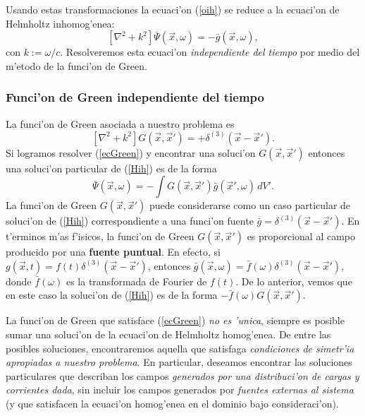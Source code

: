 Usando estas transformaciones la ecuaci'on (\ref{oih}) se reduce a la ecuaci'on de
Helmholtz inhomog'enea:
\begin{equation}
\left[ \nabla^2+k^2\right] \bar{\Psi}(\vec{x},\omega)=-\bar{g}(\vec{x},\omega),
\label{Hih}
\end{equation}
con $k:=\omega/c$. Resolveremos esta ecuaci'on \textit{independiente del tiempo} por medio del m'etodo de la funci'on de Green.

\subsubsection{Funci'on de Green independiente del tiempo}
La funci'on de Green asociada a nuestro problema es
\begin{equation}
\left[ \nabla^2+k^2\right] G(\vec{x},\vec{x}')=+\delta^{(3)}(\vec{x}-\vec{x}').
\label{ecGreen}
\end{equation}
Si logramos resolver (\ref{ecGreen}) y encontrar una soluci'on $G(\vec{x},\vec{x}')$ entonces una soluci'on particular de (\ref{Hih}) es de la forma
\begin{equation}
\bar{\Psi}(\vec{x},\omega)=-\int G(\vec{x},\vec{x}')\bar{g}(\vec{x}',\omega)\,dV'.
\end{equation}
La funci'on de Green $G(\vec{x},\vec{x}')$ puede considerarse como un caso particular de soluci'on de (\ref{Hih}) correspondiente a una funci'on fuente $\bar{g}=\delta^{(3)}(\vec{x}-\vec{x}')$. En t'erminos m'as f'isicos, la funci'on de Green $G(\vec{x},\vec{x}')$ es proporcional al campo producido por una \textbf{fuente puntual}. En efecto, si $g(\vec{x},t)=f(t)\delta^{(3)}(\vec{x}-\vec{x}')$, entonces $\bar{g}(\vec{x},\omega)=\bar{f}(\omega)\delta^{(3)}(\vec{x}-\vec{x}')$, donde $\bar{f}(\omega)$ es la transformada de Fourier de $f(t)$. De lo anterior, vemos que en este caso la soluci'on de (\ref{Hih}) es de la forma $-\bar{f}(\omega)G(\vec{x},\vec{x}')$.

La funci'on de Green que satisface (\ref{ecGreen}) \textit{no es 'unica}, siempre es posible sumar una soluci'on de la ecuaci'on de Helmholtz homog'enea. De entre las posibles soluciones, encontraremos aquella que satisfaga \textit{condiciones de simetr'ia apropiadas a nuestro problema}. En particular, deseamos encontrar las soluciones particulares que describan los campos \textit{generados por una distribuci'on de cargas y corrientes dada}, sin incluir los campos generados por \textit{fuentes externas al sistema} (y que satisfacen la ecuaci'on homog'enea en el dominio bajo consideraci'on).

